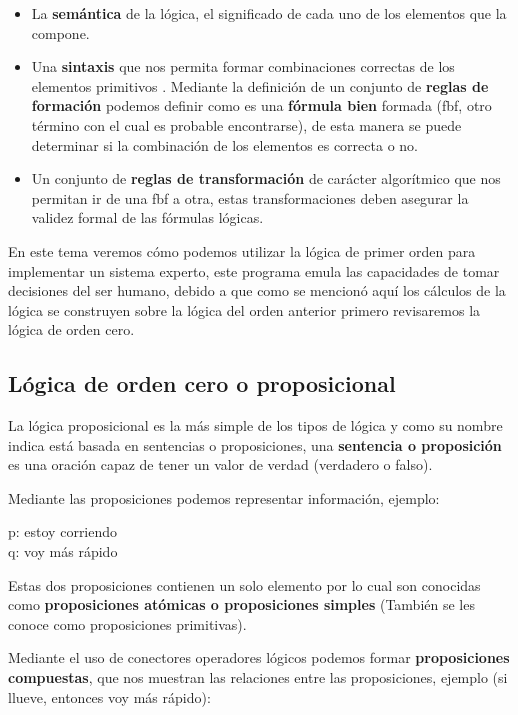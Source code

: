 \documentclass[11pt,fleqn]{book} %
\begin{document}
\begin{itemize}
\item La \textbf{semántica} de la lógica, el significado de cada uno de los elementos que la compone.
\item Una \textbf{sintaxis} que nos permita formar combinaciones correctas de los elementos primitivos . Mediante la definición de un conjunto de \textbf{reglas de formación} podemos definir como es una \textbf{fórmula bien} formada (fbf, otro término con el cual es probable encontrarse), de esta manera se puede determinar si la combinación de los elementos es correcta o no.
\item Un conjunto de \textbf{reglas de transformación} de carácter algorítmico que nos permitan ir de una fbf a otra, estas transformaciones deben asegurar la validez formal de las fórmulas lógicas.
\end{itemize}

En este tema veremos cómo podemos utilizar la lógica de primer orden para implementar un sistema experto, este programa emula las capacidades de tomar decisiones del ser humano, debido a que como se mencionó aquí los cálculos de la lógica se construyen sobre la lógica del orden anterior primero revisaremos la lógica de orden cero.

\subsection{Lógica de orden cero o proposicional} 

La lógica proposicional es la más simple de los tipos de lógica y como su nombre indica está basada en sentencias o proposiciones, una \textbf{sentencia o proposición} es una oración capaz de tener un valor de verdad (verdadero o falso).

Mediante las proposiciones podemos representar información, ejemplo:

p: estoy corriendo\\
q: voy más rápido

Estas dos proposiciones contienen un solo elemento por lo cual son conocidas como \textbf{proposiciones atómicas o proposiciones simples} (También se les conoce como proposiciones primitivas).

Mediante el uso de conectores operadores lógicos podemos formar \textbf{proposiciones compuestas}, que nos muestran las relaciones entre las proposiciones, ejemplo (si llueve, entonces voy más rápido):
\end{document}
